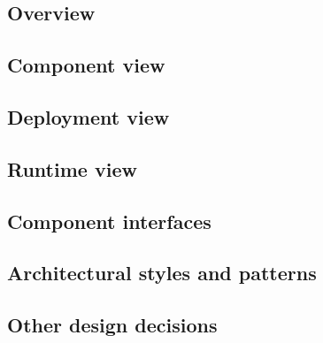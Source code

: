 

\subsection{Overview}
\label{sec:overview}


\subsection{Component view}
\label{sec:component_view}


\subsection{Deployment view}
\label{sec:deployment_view}


\newpage
\subsection{Runtime view}
\label{sec:runtime_view}


\subsection{Component interfaces}
\label{sec:component_interfaces}


\subsection{Architectural styles and patterns}
\label{sec:styles_patterns}


\subsection{Other design decisions}
\label{sec:other_decisionS}

